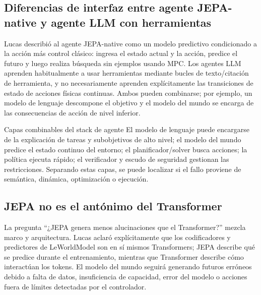 \subsection{Diferencias de interfaz entre agente JEPA-native y agente LLM con herramientas}

Lucas describió al agente JEPA-native como un modelo predictivo condicionado a la acción más control clásico: ingresa el estado actual y la acción, predice el futuro y luego realiza búsqueda sin ejemplos usando MPC. Los agentes LLM aprenden habitualmente a usar herramientas mediante bucles de texto/citación de herramienta, y no necesariamente aprenden explícitamente las transiciones de estado de acciones físicas continuas. Ambos pueden combinarse; por ejemplo, un modelo de lenguaje descompone el objetivo y el modelo del mundo se encarga de las consecuencias de acción de nivel inferior.


\begin{knowledgebox}{Capas combinables del stack de agente}
El modelo de lenguaje puede encargarse de la explicación de tareas y subobjetivos de alto nivel; el modelo del mundo predice el estado continuo del entorno; el planificador/solver busca acciones; la política ejecuta rápido; el verificador y escudo de seguridad gestionan las restricciones. Separando estas capas, se puede localizar si el fallo proviene de semántica, dinámica, optimización o ejecución.
\end{knowledgebox}

\subsection{JEPA no es el antónimo del Transformer}

La pregunta ``¿JEPA genera menos alucinaciones que el Transformer?'' mezcla marco y arquitectura. Lucas aclaró explícitamente que los codificadores y predictores de LeWorldModel son en sí mismos Transformers; JEPA describe qué se predice durante el entrenamiento, mientras que Transformer describe cómo interactúan los tokens. El modelo del mundo seguirá generando futuros erróneos debido a falta de datos, insuficiencia de capacidad, error del modelo o acciones fuera de límites detectadas por el controlador.

